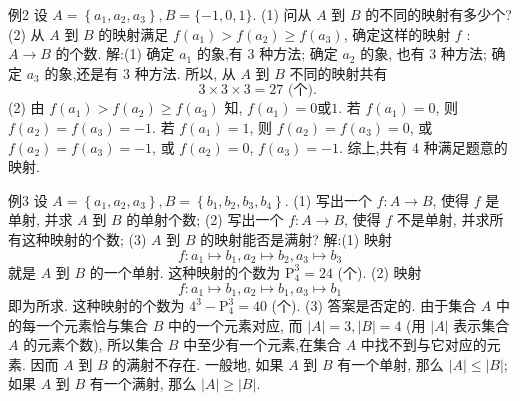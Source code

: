 例2 设 $A=\left\{a_1, a_2, a_3\right\}, B=\{-1,0,1\}$.
(1) 问从 $A$ 到 $B$ 的不同的映射有多少个?
(2) 从 $A$ 到 $B$ 的映射满足 $f\left(a_1\right)>f\left(a_2\right) \geqslant f\left(a_3\right)$, 确定这样的映射 $f$ : $A \rightarrow B$ 的个数.
解:(1) 确定 $a_1$ 的象,有 3 种方法; 确定 $a_2$ 的象, 也有 3 种方法; 确定 $a_3$ 的象,还是有 3 种方法.
所以, 从 $A$ 到 $B$ 不同的映射共有
$$
3 \times 3 \times 3=27 \text { (个). }
$$
(2) 由 $f\left(a_1\right)>f\left(a_2\right) \geqslant f\left(a_3\right)$ 知, $f\left(a_1\right)=0 或 1$.
若 $f\left(a_1\right)=0$, 则 $f\left(a_2\right)=f\left(a_3\right)=-1$.
若 $f\left(a_1\right)=1$, 则 $f\left(a_2\right)=f\left(a_3\right)=0$, 或 $f\left(a_2\right)=f\left(a_3\right)=-1$, 或 $f\left(a_2\right)=0$, $f\left(a_3\right)=-1$.
综上,共有 4 种满足题意的映射.



例3 设 $A=\left\{a_1, a_2, a_3\right\}, B=\left\{b_1, b_2, b_3, b_4\right\}$.
(1) 写出一个 $f: A \rightarrow B$, 使得 $f$ 是单射, 并求 $A$ 到 $B$ 的单射个数;
(2) 写出一个 $f: A \rightarrow B$, 使得 $f$ 不是单射, 并求所有这种映射的个数;
(3) $A$ 到 $B$ 的映射能否是满射?
解:(1) 映射
$$
f: a_1 \mapsto b_1, a_2 \mapsto b_2, a_3 \mapsto b_3
$$
就是 $A$ 到 $B$ 的一个单射.
这种映射的个数为 $\mathrm{P}_4^3=24$ (个).
(2) 映射
$$
f: a_1 \mapsto b_1, a_2 \mapsto b_1, a_3 \mapsto b_1
$$
即为所求.
这种映射的个数为 $4^3-\mathrm{P}_4^3=40$ (个).
(3) 答案是否定的.
由于集合 $A$ 中的每一个元素恰与集合 $B$ 中的一个元素对应, 而 $|A|=3,|B|=4$ (用 $|A|$ 表示集合 $A$ 的元素个数), 所以集合 $B$ 中至少有一个元素,在集合 $A$ 中找不到与它对应的元素.
因而 $A$ 到 $B$ 的满射不存在.
一般地, 如果 $A$ 到 $B$ 有一个单射, 那么 $|A| \leqslant|B|$; 如果 $A$ 到 $B$ 有一个满射, 那么 $|A| \geqslant|B|$.



